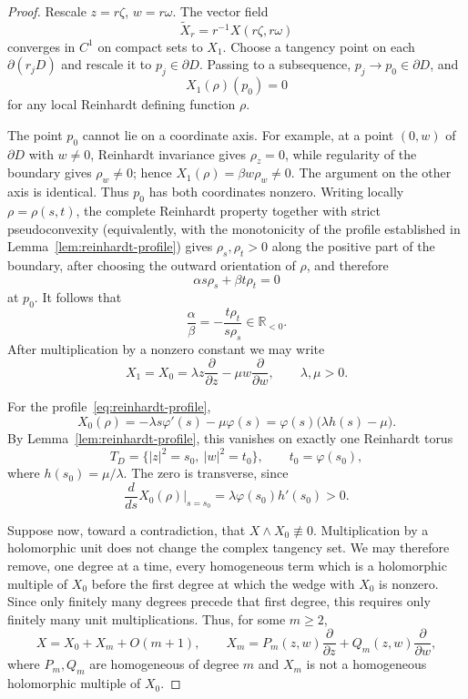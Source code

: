 \documentclass[11pt,reqno]{article}
\theoremstyle{remark}
\newcommand{\R}{\mathbb R}
\newcommand{\pd}{\partial}
\begin{document}
\begin{proof}
Rescale $z=r\zeta$, $w=r\omega$. The vector field
\[
 \widetilde X_r=r^{-1}X(r\zeta,r\omega)
\]
converges in $C^1$ on compact sets to $X_1$. Choose a tangency point on each $\partial(r_jD)$ and rescale it to $p_j\in\partial D$. Passing to a subsequence, $p_j\to p_0\in\partial D$, and
\[
 X_1(\rho)(p_0)=0
\]
for any local Reinhardt defining function $\rho$.

The point $p_0$ cannot lie on a coordinate axis. For example, at a point $(0,w)$ of $\partial D$ with $w\ne0$, Reinhardt invariance gives $\rho_z=0$, while regularity of the boundary gives $\rho_w\ne0$; hence $X_1(\rho)=\beta w\rho_w\ne0$. The argument on the other axis is identical. Thus $p_0$ has both coordinates nonzero. Writing locally $\rho=\rho(s,t)$, the complete Reinhardt property together with strict pseudoconvexity (equivalently, with the monotonicity of the profile established in Lemma~\ref{lem:reinhardt-profile}) gives $\rho_s,\rho_t>0$ along the positive part of the boundary, after choosing the outward orientation of $\rho$, and therefore
\[
 \alpha s\rho_s+\beta t\rho_t=0
\]
at $p_0$. It follows that
\[
 \frac{\alpha}{\beta}=-\frac{t\rho_t}{s\rho_s}\in\R_{<0}.
\]
After multiplication by a nonzero constant we may write
\[
 X_1=X_0=\lambda z\frac{\pd}{\pd z}-\mu w\frac{\pd}{\pd w},
 \qquad \lambda,\mu>0.
\]

For the profile~\eqref{eq:reinhardt-profile},
\begin{equation}\label{eq:linear-reinhardt-tangency}
 X_0(\rho)
 =-\lambda s\varphi'(s)-\mu\varphi(s)
 =\varphi(s)\bigl(\lambda h(s)-\mu\bigr).
\end{equation}
By Lemma~\ref{lem:reinhardt-profile}, this vanishes on exactly one Reinhardt torus
\[
 T_D=\{|z|^2=s_0,\ |w|^2=t_0\},
 \qquad t_0=\varphi(s_0),
\]
where $h(s_0)=\mu/\lambda$. The zero is transverse, since
\begin{equation}\label{eq:transverse-reinhardt-zero}
 \frac{d}{ds}X_0(\rho)\Big|_{s=s_0}
 =\lambda\varphi(s_0)h'(s_0)>0.
\end{equation}

Suppose now, toward a contradiction, that $X\wedge X_0\not\equiv0$. Multiplication by a holomorphic unit does not change the complex tangency set. We may therefore remove, one degree at a time, every homogeneous term which is a holomorphic multiple of $X_0$ before the first degree at which the wedge with $X_0$ is nonzero. Since only finitely many degrees precede that first degree, this requires only finitely many unit multiplications. Thus, for some $m\ge2$,
\[
 X=X_0+X_m+O(m+1),
 \qquad
 X_m=P_m(z,w)\frac{\pd}{\pd z}+Q_m(z,w)\frac{\pd}{\pd w},
\]
where $P_m,Q_m$ are homogeneous of degree $m$ and $X_m$ is not a homogeneous holomorphic multiple of $X_0$.


\end{proof}
\end{document}
